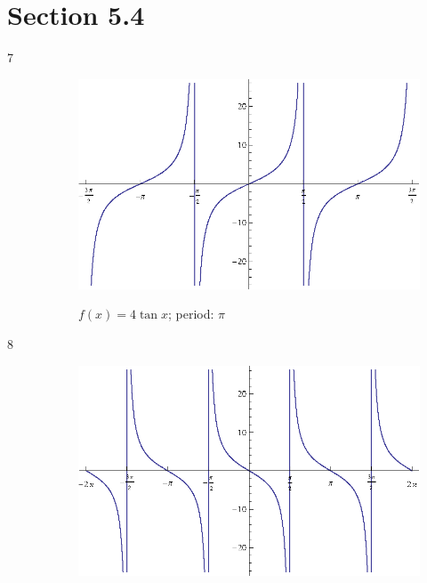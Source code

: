 \documentclass{exam}
\begin{document}
  \ifprintanswers

    \pagebreak

    \section{Section 5.4}
    \begin{description}

      \item[7]
        
        \begin{figure}[H]
          \centering
          \includegraphics[scale=0.9]{exercise07.eps}

          $f(x) = 4 \tan x$; period: $\pi$

        \end{figure}

      \item[8]
        \begin{figure}[H]
          \centering
          \includegraphics[scale=0.9]{exercise08.eps}


\end{figure}
\end{description}
\end{document}

